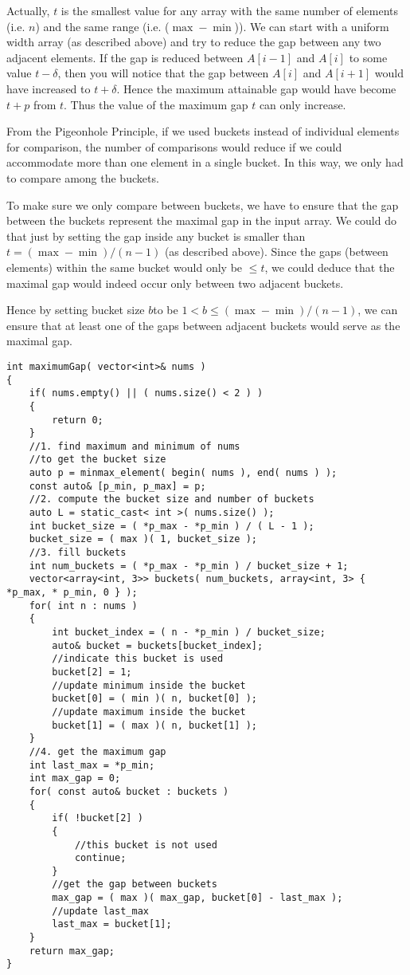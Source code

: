 Actually, $t$ is the smallest value for any array with the same number of elements (i.e. $n$) and the same range (i.e. ($\max−\min$)). We can start with a uniform width array (as described above) and try to reduce the gap between any two adjacent elements. If the gap is reduced between $A[i−1]$ and $A[i]$ to some value $t−\delta$, then you will notice that the gap between $A[i]$ and $A[i+1]$ would have increased to $t+\delta$. Hence the maximum attainable gap would have become $t+p$ from $t$. Thus the value of the maximum gap $t$ can only increase.

From the Pigeonhole Principle, if we used buckets instead of individual elements for comparison, the number of comparisons would reduce if we could accommodate more than one element in a single bucket. In this way, we only had to compare among the buckets. 

To make sure we only compare between buckets, we have to ensure that the gap between the buckets represent the maximal gap in the input array. We could do that just by setting the gap inside any bucket is smaller than $t=(\max−\min)/(n−1)$ (as described above). Since the gaps (between elements) within the same bucket would only be $\leq t$, we could deduce that the maximal gap would indeed occur only between two adjacent buckets.

Hence by setting bucket size $b$to be $1<b\leq(\max−\min)/(n−1)$, we can ensure that at least one of the gaps between adjacent buckets would serve as the maximal gap.

\setcounter{lstlisting}{0}
\begin{lstlisting}[style=customc, caption={Bucket Sort}]
int maximumGap( vector<int>& nums )
{
    if( nums.empty() || ( nums.size() < 2 ) )
    {
        return 0;
    }
    //1. find maximum and minimum of nums
    //to get the bucket size
    auto p = minmax_element( begin( nums ), end( nums ) );
    const auto& [p_min, p_max] = p;
    //2. compute the bucket size and number of buckets
    auto L = static_cast< int >( nums.size() );
    int bucket_size = ( *p_max - *p_min ) / ( L - 1 );
    bucket_size = ( max )( 1, bucket_size );
    //3. fill buckets
    int num_buckets = ( *p_max - *p_min ) / bucket_size + 1;
    vector<array<int, 3>> buckets( num_buckets, array<int, 3> { *p_max, * p_min, 0 } );
    for( int n : nums )
    {
        int bucket_index = ( n - *p_min ) / bucket_size;
        auto& bucket = buckets[bucket_index];
        //indicate this bucket is used
        bucket[2] = 1;
        //update minimum inside the bucket
        bucket[0] = ( min )( n, bucket[0] );
        //update maximum inside the bucket
        bucket[1] = ( max )( n, bucket[1] );
    }
    //4. get the maximum gap
    int last_max = *p_min;
    int max_gap = 0;
    for( const auto& bucket : buckets )
    {
        if( !bucket[2] )
        {
            //this bucket is not used
            continue;
        }
        //get the gap between buckets
        max_gap = ( max )( max_gap, bucket[0] - last_max );
        //update last_max
        last_max = bucket[1];
    }
    return max_gap;
}
\end{lstlisting}